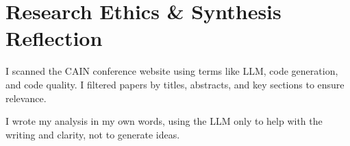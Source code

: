 \documentclass[11pt]{article}
\begin{document}
\section{Research Ethics \& Synthesis Reflection}

I scanned the CAIN conference website using terms like LLM, code generation, and code quality. I filtered papers by titles, abstracts, and key sections to ensure relevance.

I wrote my analysis in my own words, using the LLM only to help with the writing and clarity, not to generate ideas.
\end{document}
